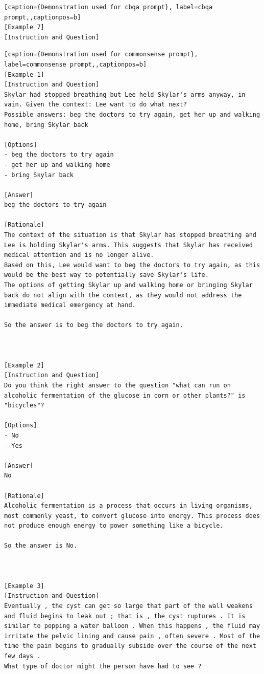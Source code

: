 \begin{lstlisting}[caption={Demonstration used for cbqa prompt}, label=cbqa prompt,,captionpos=b]
[Example 7]
[Instruction and Question]

    \end{lstlisting}




\begin{lstlisting}[caption={Demonstration used for commonsense prompt}, label=commonsense prompt,,captionpos=b]
[Example 1]
[Instruction and Question]
Skylar had stopped breathing but Lee held Skylar's arms anyway, in vain. Given the context: Lee want to do what next?
Possible answers: beg the doctors to try again, get her up and walking home, bring Skylar back

[Options]
- beg the doctors to try again
- get her up and walking home
- bring Skylar back

[Answer]
beg the doctors to try again

[Rationale]
The context of the situation is that Skylar has stopped breathing and Lee is holding Skylar's arms. This suggests that Skylar has received medical attention and is no longer alive.
Based on this, Lee would want to beg the doctors to try again, as this would be the best way to potentially save Skylar's life. 
The options of getting Skylar up and walking home or bringing Skylar back do not align with the context, as they would not address the immediate medical emergency at hand.

So the answer is to beg the doctors to try again.



[Example 2]
[Instruction and Question]
Do you think the right answer to the question "what can run on alcoholic fermentation of the glucose in corn or other plants?" is "bicycles"?

[Options]
- No
- Yes

[Answer]
No

[Rationale]
Alcoholic fermentation is a process that occurs in living organisms, most commonly yeast, to convert glucose into energy. This process does not produce enough energy to power something like a bicycle.

So the answer is No.



[Example 3]
[Instruction and Question]
Eventually , the cyst can get so large that part of the wall weakens and fluid begins to leak out ; that is , the cyst ruptures . It is similar to popping a water balloon . When this happens , the fluid may irritate the pelvic lining and cause pain , often severe . Most of the time the pain begins to gradually subside over the course of the next few days .
What type of doctor might the person have had to see ?


\end{lstlisting}

